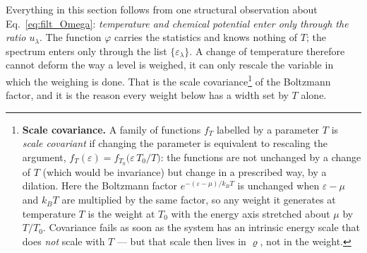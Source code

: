 \documentclass[10pt,a4paper]{article}
\theoremstyle{plain}
\theoremstyle{remark}
\begin{document}
Everything in this section follows from one structural observation about
Eq.~\eqref{eq:filt_Omega}: \emph{temperature and chemical potential enter only
through the ratio $u_\lambda$}. The function $\varphi$ carries the statistics and
knows nothing of $T$; the spectrum enters only through the list
$\{\varepsilon_\lambda\}$. A change of temperature therefore cannot deform the
way a level is weighed, it can only rescale the variable in which the weighing is done.
That is the scale covariance\footnote{\textbf{Scale covariance.} A family of
functions $ f_T $ labelled by a parameter $ T $ is \emph{scale covariant} if changing
the parameter is equivalent to rescaling the argument, $ f_T(\varepsilon) =
f_{T_0}\big(\varepsilon\,T_0/T\big) $: the functions are not unchanged by a change of
$ T $ (which would be invariance) but change in a prescribed way, by a dilation. Here
the Boltzmann factor $ e^{-(\varepsilon - \mu)/k_BT} $ is unchanged when
$ \varepsilon - \mu $ and $ k_BT $ are multiplied by the same factor, so any weight
it generates at temperature $ T $ is the weight at $ T_0 $ with the energy axis
stretched about $ \mu $ by $ T/T_0 $. Covariance fails as soon as the system has an
intrinsic energy scale that does \emph{not} scale with $ T $ --- but that scale then
lives in $ \varrho $, not in the weight.} of the Boltzmann factor, and it is the
reason every weight below has a width set by $T$ alone.
\end{document}

